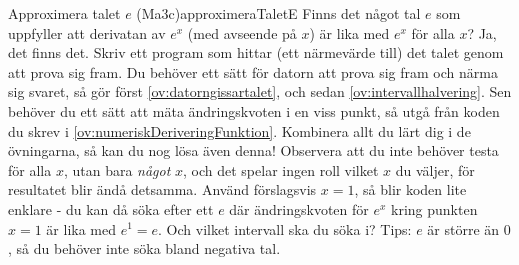 \begin{matteovnings}{Approximera talet $e$ (Ma3c)}{approximeraTaletE}
Finns det något tal $e$ som uppfyller att derivatan av $e^x$ (med avseende på $x$) är lika med $e^x$ för alla $x$? Ja, det finns det. Skriv ett program som hittar (ett närmevärde till) det talet genom att prova sig fram.
\newline
\newline
Du behöver ett sätt för datorn att prova sig fram och närma sig svaret, så gör först \autoref{ov:datorngissartalet}, och sedan \autoref{ov:intervallhalvering}.
\newline
\newline
Sen behöver du ett sätt att mäta ändringskvoten i en viss punkt, så utgå från koden du skrev i \autoref{ov:numeriskDeriveringFunktion}. Kombinera allt du lärt dig i de övningarna, så kan du nog lösa även denna!
\newline
\newline
Observera att du inte behöver testa för alla $x$, utan bara \emph{något} $x$, och det spelar ingen roll vilket $x$ du väljer, för resultatet blir ändå detsamma. Använd förslagsvis $x=1$, så blir koden lite enklare - du kan då söka efter ett $e$ där ändringskvoten för $e^x$ kring punkten $x=1$ är lika med $e^1 = e$. Och vilket intervall ska du söka i? Tips: $e$ är större än $0$, så du behöver inte söka bland negativa tal.
\end{matteovnings}
